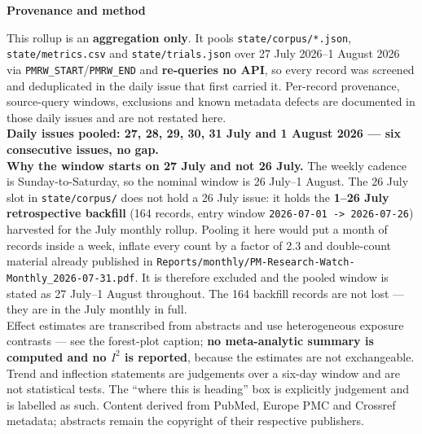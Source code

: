 \documentclass[10pt]{article}
\providecommand{\PERIODSTART}{27 July 2026}
\providecommand{\PERIODEND}{1 August 2026}
\begin{document}
\vspace{4mm}
\begin{keybox}
{\sffamily\bfseries\footnotesize\color{Deep}Provenance and method}\\[1.2mm]
{\fontsize{7.2}{8.8}\selectfont
This rollup is an \textbf{aggregation only}. It pools \texttt{state/corpus/*.json},
\texttt{state/metrics.csv} and \texttt{state/trials.json} over
\PERIODSTART{}--\PERIODEND{} via \texttt{PMRW\_START}/\texttt{PMRW\_END} and
\textbf{re-queries no API}, so every record was screened and deduplicated in the daily
issue that first carried it. Per-record provenance, source-query windows, exclusions and
known metadata defects are documented in those daily issues and are not restated here.
\\[1.0mm]
\textbf{Daily issues pooled: 27, 28, 29, 30, 31 July and 1 August 2026 --- six
consecutive issues, no gap.}
\\[1.0mm]
\textbf{Why the window starts on 27 July and not 26 July.} The weekly cadence is
Sunday-to-Saturday, so the nominal window is 26 July--1 August. The 26 July slot in
\texttt{state/corpus/} does not hold a 26 July issue: it holds the \textbf{1--26 July
retrospective backfill} (164 records, entry window \texttt{2026-07-01 -> 2026-07-26})
harvested for the July monthly rollup. Pooling it here would put a month of records
inside a week, inflate every count by a factor of 2.3 and double-count material already
published in \texttt{Reports/monthly/PM-Research-Watch-Monthly\_2026-07-31.pdf}. It is
therefore excluded and the pooled window is stated as 27 July--1 August throughout.
The 164 backfill records are not lost --- they are in the July monthly in full.
\\[1.0mm]
Effect estimates are transcribed from abstracts and use heterogeneous exposure contrasts
--- see the forest-plot caption; \textbf{no meta-analytic summary is computed and no
$I^2$ is reported}, because the estimates are not exchangeable. Trend and inflection
statements are judgements over a six-day window and are not statistical tests. The
``where this is heading'' box is explicitly judgement and is labelled as such. Content
derived from PubMed, Europe PMC and Crossref metadata; abstracts remain the copyright of
their respective publishers.\par}
\end{keybox}
\end{document}
